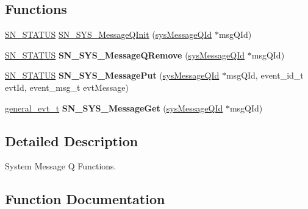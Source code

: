 \subsection*{Functions}
\begin{DoxyCompactItemize}
\item 
\hyperlink{group__SYSTEM__ERROR_ga4540713b9a7a18ce44d78c3a10f7442f}{S\+N\+\_\+\+S\+T\+A\+T\+US} \hyperlink{group__SYSTEM__MESSAGE__Q_ga35e9ff084626dfccd36d098827638a0c}{S\+N\+\_\+\+S\+Y\+S\+\_\+\+Message\+Q\+Init} (\hyperlink{structsys__message__queue}{sys\+Message\+Q\+Id} $\ast$msg\+Q\+Id)
\item 
\mbox{\label{group__SYSTEM__MESSAGE__Q_ga293a77ea597b70f3f2f38b919f93497e}} 
\hyperlink{group__SYSTEM__ERROR_ga4540713b9a7a18ce44d78c3a10f7442f}{S\+N\+\_\+\+S\+T\+A\+T\+US} {\bfseries S\+N\+\_\+\+S\+Y\+S\+\_\+\+Message\+Q\+Remove} (\hyperlink{structsys__message__queue}{sys\+Message\+Q\+Id} $\ast$msg\+Q\+Id)
\item 
\mbox{\label{group__SYSTEM__MESSAGE__Q_ga36e115419d4cbbfe4a6bde6e3fecf180}} 
\hyperlink{group__SYSTEM__ERROR_ga4540713b9a7a18ce44d78c3a10f7442f}{S\+N\+\_\+\+S\+T\+A\+T\+US} {\bfseries S\+N\+\_\+\+S\+Y\+S\+\_\+\+Message\+Put} (\hyperlink{structsys__message__queue}{sys\+Message\+Q\+Id} $\ast$msg\+Q\+Id, event\+\_\+id\+\_\+t evt\+Id, event\+\_\+msg\+\_\+t evt\+Message)
\item 
\mbox{\label{group__SYSTEM__MESSAGE__Q_gafb2da611b3c93f1f906109e7737d67cf}} 
\hyperlink{structgeneral__evt__t}{general\+\_\+evt\+\_\+t} {\bfseries S\+N\+\_\+\+S\+Y\+S\+\_\+\+Message\+Get} (\hyperlink{structsys__message__queue}{sys\+Message\+Q\+Id} $\ast$msg\+Q\+Id)
\end{DoxyCompactItemize}


\subsection{Detailed Description}
System Message Q Functions. 



\subsection{Function Documentation}
\mbox{\label{group__SYSTEM__MESSAGE__Q_ga35e9ff084626dfccd36d098827638a0c}} 
